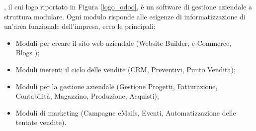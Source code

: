 , il cui logo riportato in Figura \ref{logo_odoo}, è un software di gestione aziendale a struttura modulare.
Ogni modulo risponde alle esigenze di informatizzazione di un'area
funzionale dell'impresa, ecco le principali:
\begin{itemize}
	\item Moduli per creare il sito web aziendale (Website Builder, e-Commerce,\\ Blogs );
	\item Moduli inerenti il ciclo delle vendite (CRM, Preventivi, Punto Vendita);
	\item Moduli per la gestione aziendale (Gestione Progetti, Fatturazione, Contabilità, Magazzino, Produzione, Acquisti);
	\item Moduli di marketing (Campagne eMails, Eventi, Automatizzazione delle tentate vendite).
\end{itemize}